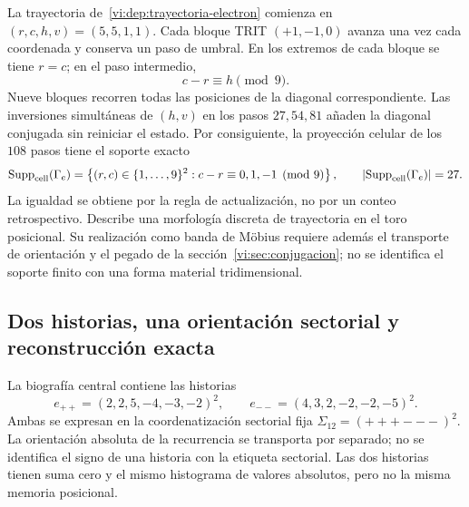 La trayectoria de~\eqref{vi:dep:trayectoria-electron} comienza en
$(r,c,h,v)=(5,5,1,1)$. Cada bloque TRIT $(+1,-1,0)$ avanza una vez cada
coordenada y conserva un paso de umbral. En los extremos de cada bloque se
tiene $r=c$; en el paso intermedio,
\[
 c-r\equiv h\pmod 9.
\]
Nueve bloques recorren todas las posiciones de la diagonal correspondiente.
Las inversiones simultáneas de $(h,v)$ en los pasos $27,54,81$ añaden la
diagonal conjugada sin reiniciar el estado. Por consiguiente, la proyección
celular de los $108$ pasos tiene el soporte exacto
\begin{equation}
 \operatorname{Supp}_{\rm cell}(\Gamma_e)
 =\left\{(r,c)\in\{1,\ldots,9\}^2:
 c-r\equiv0,1,-1\pmod9\right\},
 \qquad
 \left|\operatorname{Supp}_{\rm cell}(\Gamma_e)\right|=27.
 \label{vi:eq:soporte-electron-27}
\end{equation}
La igualdad se obtiene por la regla de actualización, no por un conteo
retrospectivo. Describe una morfología discreta de trayectoria en el toro
posicional. Su realización como banda de Möbius requiere además el transporte
de orientación y el pegado de la sección~\ref{vi:sec:conjugacion}; no se
identifica el soporte finito con una forma material tridimensional.

\subsection{Dos historias, una orientación sectorial y reconstrucción exacta}

La biografía central contiene las historias
\begin{equation}
 e_{++}=(2,2,5,-4,-3,-2)^2,
 \qquad
 e_{--}=(4,3,2,-2,-2,-5)^2.
 \label{vi:eq:historias-electronicas}
\end{equation}
Ambas se expresan en la coordenatización sectorial fija
$\Sigma_{12}=(+++---)^2$. La orientación absoluta de la recurrencia se
transporta por separado; no se identifica el signo de una historia con la
etiqueta sectorial. Las dos historias tienen suma cero y el mismo histograma
de valores absolutos, pero no la misma memoria posicional.

